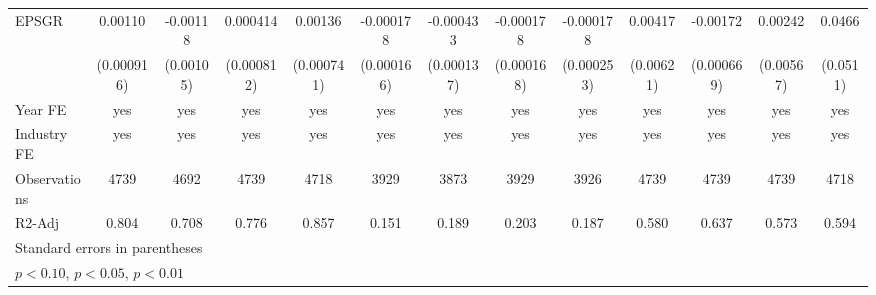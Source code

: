 {\begin{tabular}{l*{12}{c}}
EPSGR               &     0.00110         &    -0.00118         &    0.000414         &     0.00136\sym{*}  &   -0.000178         &   -0.000433\sym{***}&   -0.000178         &   -0.000178         &     0.00417         &    -0.00172\sym{**} &     0.00242         &      0.0466         \\
                    &  (0.000916)         &   (0.00105)         &  (0.000812)         &  (0.000741)         &  (0.000166)         &  (0.000137)         &  (0.000168)         &  (0.000253)         &   (0.00621)         &  (0.000669)         &   (0.00567)         &    (0.0511)         \\
\hline
Year FE             &         yes         &         yes         &         yes         &         yes         &         yes         &         yes         &         yes         &         yes         &         yes         &         yes         &         yes         &         yes         \\
Industry FE         &         yes         &         yes         &         yes         &         yes         &         yes         &         yes         &         yes         &         yes         &         yes         &         yes         &         yes         &         yes         \\
Observations        &        4739         &        4692         &        4739         &        4718         &        3929         &        3873         &        3929         &        3926         &        4739         &        4739         &        4739         &        4718         \\
R2-Adj              &       0.804         &       0.708         &       0.776         &       0.857         &       0.151         &       0.189         &       0.203         &       0.187         &       0.580         &       0.637         &       0.573         &       0.594         \\
\hline\hline
\multicolumn{13}{l}{\footnotesize Standard errors in parentheses}\\
\multicolumn{13}{l}{\footnotesize \sym{*} \(p<0.10\), \sym{**} \(p<0.05\), \sym{***} \(p<0.01\)}\\
\end{tabular}
}
